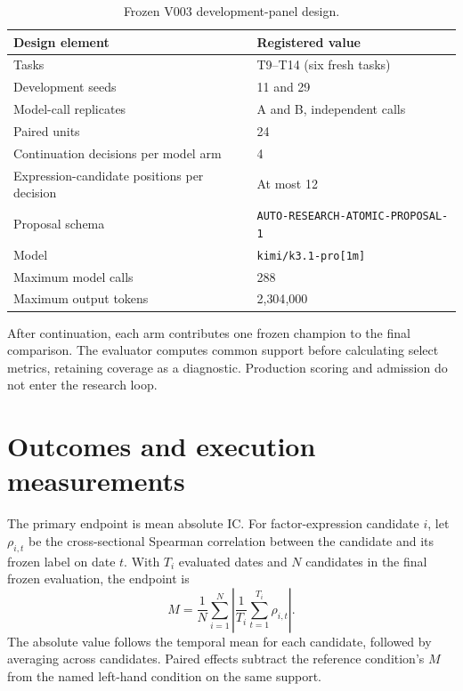 \begin{table}[!htbp]
\caption{Frozen V003 development-panel design.}
\label{tab:protocol}
\centering
\ProjectCaption
\small
\begin{tabular}{ll}
\toprule
Design element & Registered value \\
\midrule
Tasks & T9--T14 (six fresh tasks) \\
Development seeds & 11 and 29 \\
Model-call replicates & A and B, independent calls \\
Paired units & 24 \\
Continuation decisions per model arm & 4 \\
Expression-candidate positions per decision & At most 12 \\
Proposal schema & \texttt{AUTO-RESEARCH-ATOMIC-PROPOSAL-1} \\
Model & \texttt{kimi/k3.1-pro[1m]} \\
Maximum model calls & 288 \\
Maximum output tokens & 2{,}304{,}000 \\
\bottomrule
\end{tabular}
\end{table}

After continuation, each arm contributes one frozen champion to the final comparison. The evaluator computes common support before calculating select metrics, retaining coverage as a diagnostic. Production scoring and admission do not enter the research loop.

\section{Outcomes and execution measurements}
\label{sec:metrics}

The primary endpoint is mean absolute IC. For factor-expression candidate $i$, let $\rho_{i,t}$ be the cross-sectional Spearman correlation between the candidate and its frozen label on date $t$. With $T_i$ evaluated dates and $N$ candidates in the final frozen evaluation, the endpoint is
\begin{equation}
M=\frac{1}{N}\sum_{i=1}^{N}\left|\frac{1}{T_i}\sum_{t=1}^{T_i}\rho_{i,t}\right|.
\label{eq:mean-abs-ic}
\end{equation}
The absolute value follows the temporal mean for each candidate, followed by averaging across candidates. Paired effects subtract the reference condition's $M$ from the named left-hand condition on the same support.

